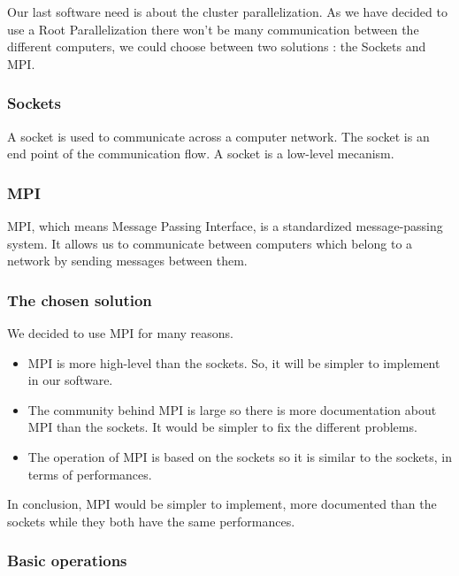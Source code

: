 Our last software need is about the cluster parallelization. As we have decided to use a Root Parallelization there won't be many communication between the different computers, we could choose between two solutions : the Sockets and MPI.

\subsubsection{Sockets}

A socket is used to communicate across a computer network. The socket is an end point of the communication flow. A socket is a low-level mecanism.

\subsubsection{MPI}

MPI, which means Message Passing Interface, is a standardized message-passing system. It allows us to communicate between computers which belong to a network by sending messages between them. 

\subsubsection{The chosen solution}

We decided to use MPI for many reasons.
\begin{itemize}
\item MPI is more high-level than the sockets. So, it will be simpler to implement in our software.
\item The community behind MPI is large so there is more documentation about MPI than the sockets. It would be simpler to fix the different problems.
\item The operation of MPI is based on the sockets so it is similar to the sockets, in terms of performances.
\end{itemize}
In conclusion, MPI would be simpler to implement, more documented than the sockets while they both have the same performances.

\subsubsection{Basic operations}

